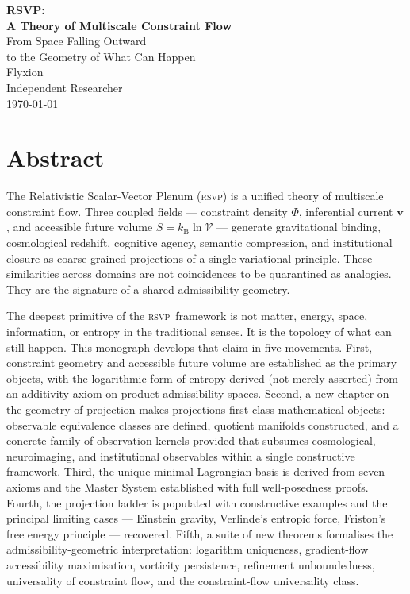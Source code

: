 \documentclass[12pt, oneside]{book}
\theoremstyle{plain}
\theoremstyle{definition}
\newcommand{\vfield}{\mathbf{v}}
\newcommand{\RSVP}{\textsc{rsvp}}
\newcommand{\kB}{k_{\mathrm{B}}}
\newcommand{\Vac}{\mathcal{V}}
\begin{document}
\thispagestyle{empty}
\vspace*{3cm}
\begin{center}
{\LARGE\bfseries RSVP:\\[0.5em]
A Theory of Multiscale Constraint Flow}\\[1.2em]
{\large From Space Falling Outward\\[0.2em]
to the Geometry of What Can Happen}\\[3em]
{\large Flyxion}\\[0.5em]
{\normalsize Independent Researcher}\\[3em]
{\normalsize\today}
\end{center}
\vfill\clearpage

\thispagestyle{empty}
\chapter*{Abstract}

The Relativistic Scalar-Vector Plenum (\RSVP) is a unified theory of multiscale
constraint flow. Three coupled fields --- constraint density $\Phi$, inferential
current $\vfield$, and accessible future volume $S = \kB\ln\Vac$ --- generate
gravitational binding, cosmological redshift, cognitive agency, semantic compression,
and institutional closure as coarse-grained projections of a single variational
principle. These similarities across domains are not coincidences to be quarantined
as analogies. They are the signature of a shared admissibility geometry.

The deepest primitive of the \RSVP\ framework is not matter, energy, space,
information, or entropy in the traditional senses. It is the topology of what can
still happen. This monograph develops that claim in five movements. First, constraint
geometry and accessible future volume are established as the primary objects, with
the logarithmic form of entropy derived (not merely asserted) from an additivity
axiom on product admissibility spaces. Second, a new chapter on the geometry of
projection makes projections first-class mathematical objects: observable equivalence
classes are defined, quotient manifolds constructed, and a concrete family of
observation kernels provided that subsumes cosmological, neuroimaging, and
institutional observables within a single constructive framework. Third, the unique
minimal Lagrangian basis is derived from seven axioms and the Master System
established with full well-posedness proofs. Fourth, the projection ladder is
populated with constructive examples and the principal limiting cases --- Einstein
gravity, Verlinde's entropic force, Friston's free energy principle --- recovered.
Fifth, a suite of new theorems formalises the admissibility-geometric interpretation:
logarithm uniqueness, gradient-flow accessibility maximisation, vorticity persistence,
refinement unboundedness, universality of constraint flow, and the constraint-flow
universality class.
\end{document}

